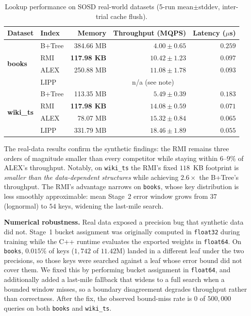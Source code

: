 \documentclass[sigconf,nonacm]{acmart}
\begin{document}
\begin{table}[t]
\centering
\caption{Lookup performance on SOSD real-world datasets (5-run mean$\pm$stddev, inter-trial cache flush).}
\label{tab:sosd}
\begin{tabular}{llrrr}
\toprule
\textbf{Dataset} & \textbf{Index} & \textbf{Memory} & \textbf{Throughput (MQPS)} & \textbf{Latency ($\mu$s)} \\
\midrule
\multirow{4}{*}{\textbf{books}}
 & B+Tree & 384.66 MB & $4.00 \pm 0.65$ & $0.259$ \\
 & RMI    & \textbf{117.98 KB} & $10.42 \pm 1.23$ & $0.097$ \\
 & ALEX   & 250.88 MB & $\mathbf{11.08 \pm 1.78}$ & $\mathbf{0.093}$ \\
 & LIPP   & \multicolumn{3}{c}{n/a (see note)} \\
\midrule
\multirow{4}{*}{\textbf{wiki\_ts}}
 & B+Tree & 113.35 MB & $5.49 \pm 0.39$ & $0.183$ \\
 & RMI    & \textbf{117.98 KB} & $14.08 \pm 0.59$ & $0.071$ \\
 & ALEX   & 78.07 MB  & $15.32 \pm 0.84$ & $0.065$ \\
 & LIPP   & 331.79 MB & $\mathbf{18.46 \pm 1.89}$ & $\mathbf{0.055}$ \\
\bottomrule
\end{tabular}
\end{table}

The real-data results confirm the synthetic findings: the RMI remains three orders of magnitude smaller than every competitor while staying within $6$--$9\%$ of ALEX's throughput. Notably, on \texttt{wiki\_ts} the RMI's fixed $118$~KB footprint is \textit{smaller than the data-dependent structures} while achieving $2.6\times$ the B+Tree's throughput. The RMI's advantage narrows on \texttt{books}, whose key distribution is less smoothly approximable: mean Stage~2 error window grows from $37$ (lognormal) to $54$ keys, widening the last-mile search.

\medskip
\noindent\textbf{Numerical robustness.} Real data exposed a precision bug that synthetic data did not. Stage~1 bucket assignment was originally computed in \texttt{float32} during training while the C++ runtime evaluates the exported weights in \texttt{float64}. On \texttt{books}, $0.015\%$ of keys ($1{,}742$ of $11.42$M) landed in a different leaf under the two precisions, so those keys were searched against a leaf whose error bound did not cover them. We fixed this by performing bucket assignment in \texttt{float64}, and additionally added a last-mile fallback that widens to a full search when a bounded window misses, so a boundary disagreement degrades throughput rather than correctness. After the fix, the observed bound-miss rate is $0$ of $500{,}000$ queries on both \texttt{books} and \texttt{wiki\_ts}.
\end{document}
